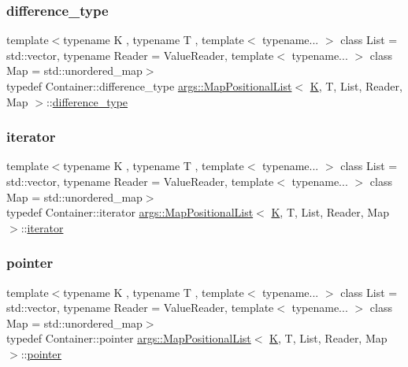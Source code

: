 \subsubsection{\texorpdfstring{difference\+\_\+type}{difference\_type}}
{\footnotesize\ttfamily template$<$typename K , typename T , template$<$ typename... $>$ class List = std\+::vector, typename Reader  = Value\+Reader, template$<$ typename... $>$ class Map = std\+::unordered\+\_\+map$>$ \\
typedef Container\+::difference\+\_\+type \hyperlink{classargs_1_1_map_positional_list}{args\+::\+Map\+Positional\+List}$<$ \hyperlink{cgal__test_8cpp_a891e241aa245ae63618f03737efba309}{K}, T, List, Reader, Map $>$\+::\hyperlink{classargs_1_1_map_positional_list_a60aba0aee19ccedfcfd02074339d0e1c}{difference\+\_\+type}}

\mbox{\label{classargs_1_1_map_positional_list_a4e3fbeb6f894505ce48d35fe76dc157a}} 
\subsubsection{\texorpdfstring{iterator}{iterator}}
{\footnotesize\ttfamily template$<$typename K , typename T , template$<$ typename... $>$ class List = std\+::vector, typename Reader  = Value\+Reader, template$<$ typename... $>$ class Map = std\+::unordered\+\_\+map$>$ \\
typedef Container\+::iterator \hyperlink{classargs_1_1_map_positional_list}{args\+::\+Map\+Positional\+List}$<$ \hyperlink{cgal__test_8cpp_a891e241aa245ae63618f03737efba309}{K}, T, List, Reader, Map $>$\+::\hyperlink{classargs_1_1_map_positional_list_a4e3fbeb6f894505ce48d35fe76dc157a}{iterator}}

\mbox{\label{classargs_1_1_map_positional_list_ac005fb0e2fa99bc6e6b39103cb605d17}} 
\subsubsection{\texorpdfstring{pointer}{pointer}}
{\footnotesize\ttfamily template$<$typename K , typename T , template$<$ typename... $>$ class List = std\+::vector, typename Reader  = Value\+Reader, template$<$ typename... $>$ class Map = std\+::unordered\+\_\+map$>$ \\
typedef Container\+::pointer \hyperlink{classargs_1_1_map_positional_list}{args\+::\+Map\+Positional\+List}$<$ \hyperlink{cgal__test_8cpp_a891e241aa245ae63618f03737efba309}{K}, T, List, Reader, Map $>$\+::\hyperlink{classargs_1_1_map_positional_list_ac005fb0e2fa99bc6e6b39103cb605d17}{pointer}}


